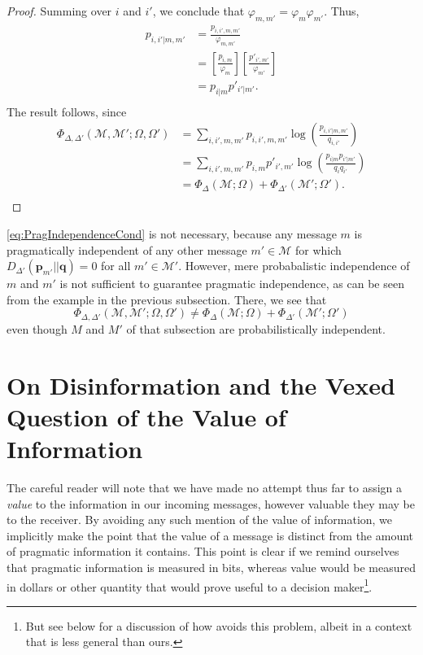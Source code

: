\documentclass[11pt]{article}
\begin{document}
\begin{proof}
Summing over $i$ and $i'$, we conclude that $\varphi_{m, m'} = \varphi_m \varphi_{m'}$.  Thus, 
\begin{align*}
p_{i, i' | m, m'} &= \frac{p_{i, i', m, m'}}{\varphi_{m, m'}} \\
                       &= \left[\frac{p_{i, m}}{\varphi_{m}}\right] \left[\frac{p'_{i', m'}}{\varphi_{m'}}\right] \\
                       &= p_{i|m} p'_{i'|m'}.  \\
\end{align*}
The result follows, since
\begin{align*}
\Phi_{\Delta, \Delta'} (\mathcal M, \mathcal M'; \Omega, \Omega') 
                       &= \sum_{i, i', m, m'} p_{i, i', m, m'} \log \left(\frac{p_{i,i'|m, m'}}{q_{i,i'}}\right)  \\
                       &= \sum_{i, i', m, m'}p_{i, m} p'_{i', m'} \log \left(\frac{p_{i|m} p_{i'|m'}}{q_{i}q_{i'}}\right)  \\
                       &= \Phi_{\Delta} ({\mathcal M}; \Omega)  + \Phi_{\Delta'} ({\mathcal M'}; \Omega').\\
\end{align*}
\end{proof}
\eqref{eq:PragIndependenceCond} is not necessary, because any message $m$ is pragmatically independent of any other message $m' \in \mathcal M$ for which 
$D_{\Delta'}(\mathbf p_{m'} || \mathbf q) = 0$ for all $m' \in \mathcal M'$.  However, mere probabalistic 
independence of $m$ and $m'$ is not sufficient to guarantee pragmatic independence, as can be seen from the example in 
the previous subsection.  There, we see that
$$
\Phi_{\Delta, \Delta'} (\mathcal M, \mathcal M'; \Omega, \Omega') \neq \Phi_{\Delta} ({\mathcal M}; \Omega)  +
\Phi_{\Delta'} ({\mathcal M'}; \Omega')   
$$
even though $M$ and $M'$ of that subsection are probabilistically independent.


\section{On Disinformation and the Vexed Question of the Value of Information}
The careful reader will note that we have made no attempt thus far to assign a {\it value} to the information in our incoming messages, however valuable they may be to the receiver.  By avoiding any such mention 
of the value of information, we implicitly make the point that the value of a
message is distinct from the amount of pragmatic information it contains.  This point is clear if we remind ourselves 
that pragmatic information is measured in bits, whereas value would be measured in dollars or other 
quantity that would prove useful to a decision maker\footnote{But see below for a discussion of how \cite{Wolpert} 
avoids this problem, albeit in a context that is less general than ours.}.
\\
\end{document}
